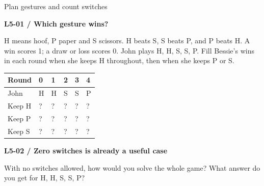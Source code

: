 \documentclass[11pt,a4paper]{article}
\begin{document}
\par\noindent\begin{minipage}{\linewidth}
{\heavy\fontsize{12}{15}\selectfont Plan gestures and count switches\par}\medskip
\textbf{L5-01 / Which gesture wins?}\par\smallskip H means hoof, P paper and S scissors. H beats S, S beats P, and P beats H. A win scores 1; a draw or loss scores 0. John plays H, H, S, S, P. Fill Bessie's wins in each round when she keeps H throughout, then when she keeps P or S.\par
\par\medskip \begingroup\small\setlength{\tabcolsep}{4pt}\renewcommand{\arraystretch}{1.35}\begin{tabularx}{\linewidth}{>{\raggedright\arraybackslash}X>{\raggedright\arraybackslash}X>{\raggedright\arraybackslash}X>{\raggedright\arraybackslash}X>{\raggedright\arraybackslash}X>{\raggedright\arraybackslash}X}\toprule\textbf{Round} & \textbf{0} & \textbf{1} & \textbf{2} & \textbf{3} & \textbf{4}\\\midrule
John & H & H & S & S & P\\
Keep H & ? & ? & ? & ? & ?\\
Keep P & ? & ? & ? & ? & ?\\
Keep S & ? & ? & ? & ? & ?\\
\bottomrule\end{tabularx}\endgroup\par\medskip 
\end{minipage}\par\vspace{4mm}
\par\noindent\begin{minipage}{\linewidth}
\textbf{L5-02 / Zero switches is already a useful case}\par\smallskip With no switches allowed, how would you solve the whole game? What answer do you get for H, H, S, S, P?\par
\end{minipage}\par\vspace{4mm}
\end{document}
